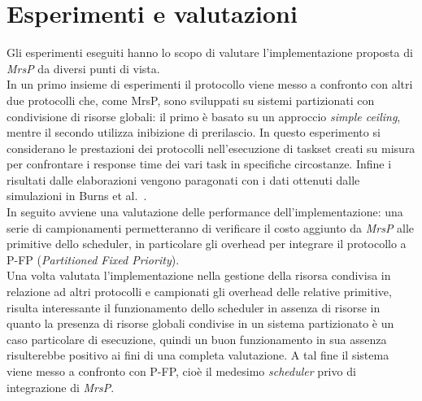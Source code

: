 










\section{Esperimenti e valutazioni}
\label{sec:esperimenti}

\noindent Gli esperimenti eseguiti hanno lo scopo di valutare l'implementazione proposta di \emph{MrsP} da diversi punti di vista.\\

\noindent In un primo insieme di esperimenti il protocollo viene messo a confronto con altri due protocolli che, come MrsP, sono sviluppati su sistemi partizionati con condivisione di risorse globali: il primo è basato su un approccio \textit{simple ceiling}, mentre il secondo utilizza inibizione di prerilascio. In questo esperimento si considerano le prestazioni dei protocolli nell'esecuzione di taskset creati su misura per confrontare i response time dei vari task in specifiche circostanze. Infine i risultati dalle elaborazioni vengono paragonati con i dati ottenuti dalle simulazioni in Burns et al.~\cite{Burns:2013:SCM:2547348.2547350}.\\

\noindent In seguito avviene una valutazione delle performance dell'implementazione: una serie di campionamenti permetteranno di verificare il costo aggiunto da \textit{MrsP} alle primitive dello scheduler, in particolare gli overhead per integrare il protocollo a P-FP (\textit{Partitioned Fixed Priority}).\\

\noindent Una volta valutata l'implementazione nella gestione della risorsa condivisa in relazione ad altri protocolli e campionati gli overhead delle relative primitive, risulta interessante il funzionamento dello scheduler in assenza di risorse in quanto la presenza di risorse globali condivise in un sistema partizionato è un caso particolare di esecuzione, quindi un buon funzionamento in sua assenza risulterebbe positivo ai fini di una completa valutazione. A tal fine il sistema viene messo a confronto con P-FP, cioè il medesimo \textit{scheduler} privo di integrazione di \textit{MrsP}.\\

